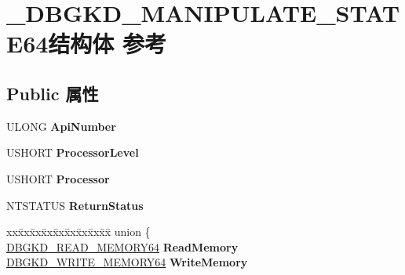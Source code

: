 \hypertarget{struct___d_b_g_k_d___m_a_n_i_p_u_l_a_t_e___s_t_a_t_e64}{}\section{\+\_\+\+D\+B\+G\+K\+D\+\_\+\+M\+A\+N\+I\+P\+U\+L\+A\+T\+E\+\_\+\+S\+T\+A\+T\+E64结构体 参考}
\label{struct___d_b_g_k_d___m_a_n_i_p_u_l_a_t_e___s_t_a_t_e64}
\subsection*{Public 属性}
\begin{DoxyCompactItemize}
\item 
\mbox{\label{struct___d_b_g_k_d___m_a_n_i_p_u_l_a_t_e___s_t_a_t_e64_aad8007bcf228da6fa4d806d466d83f75}} 
U\+L\+O\+NG {\bfseries Api\+Number}
\item 
\mbox{\label{struct___d_b_g_k_d___m_a_n_i_p_u_l_a_t_e___s_t_a_t_e64_a668d8a62e273753e9e4dc0b501ef8e56}} 
U\+S\+H\+O\+RT {\bfseries Processor\+Level}
\item 
\mbox{\label{struct___d_b_g_k_d___m_a_n_i_p_u_l_a_t_e___s_t_a_t_e64_afbba3bf08533343f4d6974031f9aab2a}} 
U\+S\+H\+O\+RT {\bfseries Processor}
\item 
\mbox{\label{struct___d_b_g_k_d___m_a_n_i_p_u_l_a_t_e___s_t_a_t_e64_a9209ca7c4e34487533c9d9cf91f8de90}} 
N\+T\+S\+T\+A\+T\+US {\bfseries Return\+Status}
\item 
\mbox{\label{struct___d_b_g_k_d___m_a_n_i_p_u_l_a_t_e___s_t_a_t_e64_a65cbcf143e693707fbac2a6e3d483470}} 
\begin{tabbing}
xx\=xx\=xx\=xx\=xx\=xx\=xx\=xx\=xx\=\kill
union \{\\
\>\hyperlink{struct___d_b_g_k_d___r_e_a_d___m_e_m_o_r_y64}{DBGKD\_READ\_MEMORY64} {\bfseries ReadMemory}\\
\>\hyperlink{struct___d_b_g_k_d___w_r_i_t_e___m_e_m_o_r_y64}{DBGKD\_WRITE\_MEMORY64} {\bfseries WriteMemory}\\

\end{tabbing}
\end{DoxyCompactItemize}
